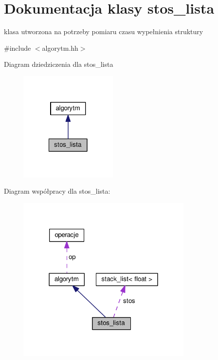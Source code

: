 \hypertarget{classstos__lista}{\section{Dokumentacja klasy stos\-\_\-lista}
\label{classstos__lista}
}


klasa utworzona na potrzeby pomiaru czasu wypełnienia struktury  




{\ttfamily \#include $<$algorytm.\-hh$>$}



Diagram dziedziczenia dla stos\-\_\-lista\nopagebreak
\begin{figure}[H]
\begin{center}
\leavevmode
\includegraphics[width=138pt]{classstos__lista__inherit__graph}
\end{center}
\end{figure}


Diagram współpracy dla stos\-\_\-lista\-:\nopagebreak
\begin{figure}[H]
\begin{center}
\leavevmode
\includegraphics[width=247pt]{classstos__lista__coll__graph}
\end{center}
\end{figure}
